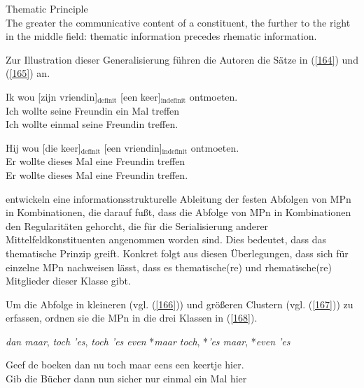 \begin{exe}
	\ex\label{163} 
		Thematic Principle\\
		The greater the communicative content of a constituent, the further to the right in the middle field: thematic information precedes rhematic 				information.
\end{exe} 		
Zur Illustration dieser Generalisierung führen die Autoren die Sätze in (\ref{164}) und (\ref{165}) an.

\begin{exe}
    \ex\label{164}
        \gll Ik  wou [zijn vriendin]$_{\textrm{definit}}$ [een keer]$_{\textrm{indefinit}}$ ontmoeten.\\
        Ich wollte seine Freundin ein Mal treffen\\
        \glt Ich wollte einmal seine Freundin treffen.
\end{exe}

\begin{exe}
    \ex\label{165}
        \gll Hij wou [die keer]$_{\textrm{definit}}$ [een vriendin]$_{\textrm{indefinit}}$ ontmoeten.\\
        Er wollte dieses Mal eine Freundin treffen\\
        \glt Er wollte dieses Mal eine Freundin treffen.
\end{exe}
\citet{Vriendt1991} entwickeln eine informationsstrukturelle Ableitung der festen Abfolgen von MPn in Kombinationen, die darauf fußt, dass die Abfolge von MPn in Kombinationen den Regularitäten gehorcht, die für die Serialisierung anderer Mittelfeldkonstituenten angenommen worden sind. Dies bedeutet, dass das thematische Prinzip greift. Konkret folgt aus diesen Überlegungen, dass sich für einzelne MPn nachweisen lässt, dass es thematische(re) und rhematische(re) Mitglieder dieser Klasse gibt.

Um die Abfolge in kleineren (vgl. (\ref{166})) und größeren Clustern (vgl. (\ref{167})) zu erfassen, ordnen sie die MPn in die drei Klassen in (\ref{168}).

\begin{exe}
	\ex\label{166} 
		\begin{xlist}	
			\ex\label{18a} \textit{dan maar}, \textit{toch 'es}, \textit{toch 'es even}
			\ex\label{18b} *\textit{maar toch}, *\textit{'es maar}, *\textit{even 'es}
		\end{xlist}
\end{exe}

\begin{exe}
	\ex\label{167} 
	\gll Geef de boeken dan nu toch maar eens een keertje hier.\\
         Gib die Bücher dann nun sicher nur einmal ein Mal hier\\
    \glt 
\hfill\hbox {\citet[47]{Vriendt1991}}
\end{exe}

